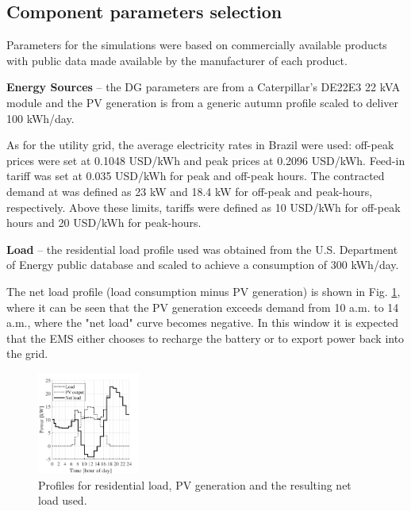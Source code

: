 \documentclass{ieeeaccess}
\begin{document}
    \subsection{Component parameters selection}
    Parameters for the simulations were based on commercially available products with public data made available by the manufacturer of each product.

    \textbf{Energy Sources} -- the \ac{DG} parameters are from a Caterpillar's DE22E3 22 kVA module and the \ac{PV} generation is from a generic autumn profile scaled to deliver 100 kWh/day.

    As for the utility grid, the average electricity rates in Brazil were used: off-peak prices were set at 0.1048 USD/kWh and peak prices at 0.2096 USD/kWh. Feed-in tariff was set at 0.035 USD/kWh for peak and off-peak hours. The contracted demand at was defined as 23 kW and 18.4 kW for off-peak and peak-hours, respectively. Above these limits, tariffs were defined as 10 USD/kWh for off-peak hours and 20 USD/kWh for peak-hours.

    \textbf{Load} -- the residential load profile used was obtained from the U.S. Department of Energy public database \cite{DOE2013} and scaled to achieve a consumption of 300 kWh/day.

    The net load profile (load consumption minus \ac{PV} generation) is shown in Fig. \ref{fig:net-load}, where it can be seen that the \ac{PV} generation exceeds demand from 10 a.m. to 14 a.m., where the "net load" curve becomes negative. In this window it is expected that the \ac{EMS} either chooses to recharge the battery or to export power back into the grid.
    \begin{figure}[htbp]
        \centering
        \includegraphics[width=0.3\textwidth]{figures/net_load.pdf}
        \caption{Profiles for residential load, \ac{PV} generation and the resulting net load used.}
        \label{fig:net-load}
    \end{figure}
\end{document}
